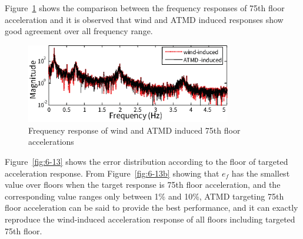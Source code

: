 Figure~\ref{fig:6-12} shows the comparison between the frequency responses of 75th floor acceleration and it is observed that wind and ATMD induced responses show good agreement over all frequency range. 

\begin{figure}[ht]
\centering
\includegraphics[width=0.8\textwidth] {figure/6-12.eps}
\caption{Frequency response of wind and ATMD induced 75th floor accelerations}
\label{fig:6-12}
\end{figure}

Figure~\ref{fig:6-13} shows the error distribution according to the floor of targeted acceleration response. From Figure~\ref{fig:6-13b} showing that $e_{f}$ has the smallest value over floors when the target response is 75th floor acceleration, and the corresponding value ranges only between 1\% and 10\%, ATMD targeting 75th floor acceleration can be said to provide the best performance, and it can exactly reproduce the wind-induced acceleration response of all floors including targeted 75th floor.

